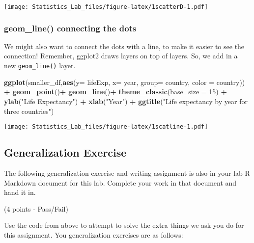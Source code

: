 \documentclass[
]{book}
\newenvironment{Shaded}{\begin{snugshade}}{\end{snugshade}}
\newcommand{\AttributeTok}[1]{\textcolor[rgb]{0.13,0.29,0.53}{#1}}
\newcommand{\DecValTok}[1]{\textcolor[rgb]{0.00,0.00,0.81}{#1}}
\newcommand{\FunctionTok}[1]{\textcolor[rgb]{0.13,0.29,0.53}{\textbf{#1}}}
\newcommand{\NormalTok}[1]{#1}
\newcommand{\SpecialCharTok}[1]{\textcolor[rgb]{0.81,0.36,0.00}{\textbf{#1}}}
\newcommand{\StringTok}[1]{\textcolor[rgb]{0.31,0.60,0.02}{#1}}
\begin{document}
\texttt{[image: Statistics\_Lab\_files/figure-latex/1scatterD-1.pdf]}

\hypertarget{geom_line-connecting-the-dots}{%
\subsubsection{geom\_line() connecting the dots}\label{geom_line-connecting-the-dots}}

We might also want to connect the dots with a line, to make it easier to see the connection! Remember, ggplot2 draws layers on top of layers. So, we add in a new \texttt{geom\_line()} layer.

\begin{Shaded}
\begin{Highlighting}[]
\FunctionTok{ggplot}\NormalTok{(smaller\_df,}\FunctionTok{aes}\NormalTok{(}\AttributeTok{y=}\NormalTok{ lifeExp, }\AttributeTok{x=}\NormalTok{ year, }
                      \AttributeTok{group=}\NormalTok{ country, }\AttributeTok{color =}\NormalTok{ country)) }\SpecialCharTok{+}
  \FunctionTok{geom\_point}\NormalTok{()}\SpecialCharTok{+} 
  \FunctionTok{geom\_line}\NormalTok{()}\SpecialCharTok{+}
  \FunctionTok{theme\_classic}\NormalTok{(}\AttributeTok{base\_size =} \DecValTok{15}\NormalTok{) }\SpecialCharTok{+}
  \FunctionTok{ylab}\NormalTok{(}\StringTok{"Life Expectancy"}\NormalTok{) }\SpecialCharTok{+} 
  \FunctionTok{xlab}\NormalTok{(}\StringTok{"Year"}\NormalTok{) }\SpecialCharTok{+}
  \FunctionTok{ggtitle}\NormalTok{(}\StringTok{"Life expectancy by year for three countries"}\NormalTok{)}
\end{Highlighting}
\end{Shaded}

\texttt{[image: Statistics\_Lab\_files/figure-latex/1scatline-1.pdf]}

\hypertarget{generalization-exercise}{%
\subsection{Generalization Exercise}\label{generalization-exercise}}

The following generalization exercise and writing assignment is also in your lab R Markdown document for this lab. Complete your work in that document and hand it in.

(4 points - Pass/Fail)

Use the code from above to attempt to solve the extra things we ask you do for this assignment. You generalization exercises are as follows:
\end{document}
